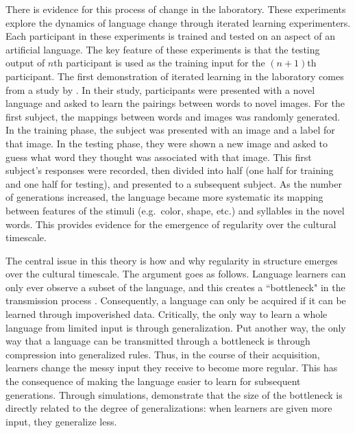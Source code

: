 \documentclass[man, noapacite, 12pt]{apa2}
\begin{document}
There is evidence for this process of change in the laboratory. These experiments explore the dynamics of language change through iterated learning experimenters. Each participant in these experiments is trained and tested on an aspect of an artificial language. The key feature of these experiments is that the testing output of $n$th participant is used as the training input for the $(n+1)$th participant. The first  demonstration of iterated learning in the laboratory comes from  a study by . In their study, participants were presented with a novel language and asked to learn the pairings between words to novel images. For the first subject, the mappings between words and images was randomly generated. In the training phase, the subject was presented with an image and a label for that image. In the testing phase, they were shown a new image and asked to guess what word they thought was associated with that image. This first subject's responses were recorded, then divided into half (one half for training and one half for testing), and presented to a subsequent subject.  As the number of generations increased, the language became more systematic its mapping between features of the stimuli (e.g.\ color, shape, etc.) and syllables in the novel words. This provides evidence for the emergence of regularity over the cultural timescale.



The central issue in this theory is how and why regularity in structure emerges over the cultural timescale. The argument goes as follows. Language learners can only ever observe a subset of the language, and this creates a ``bottleneck" in the transmission process \cite{kirby2007evolution}. Consequently, a language can only be acquired if it can be learned through impoverished data. Critically, the only way to learn a whole language from limited input is through generalization. Put another way, the only way that a language can be transmitted through a bottleneck is through compression into generalized rules. Thus, in the course of their acquisition, learners change the messy input they receive to become more  regular. This has the consequence of making the language  easier to learn for subsequent generations. Through simulations,  demonstrate that the size of the bottleneck is directly related to the degree of generalizations: when learners are given more input, they generalize less.
\end{document}
